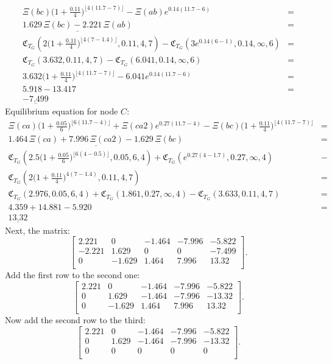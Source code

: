 \documentclass[10pt]{article}
\newcommand{\CC}{\mathfrak{C}}
\begin{document}
\begin{align*}
\Xi(bc) \Big( 1 + \frac{0.11}{4} \Big)^{ \lfloor 4(11.7 - 7) \rfloor } - \Xi(ab) e^{0.14( 11.7 - 6 ) } &= \\
\underline{ 1.629 \, \Xi(bc) - 2.221 \, \Xi(ab) } &= \\
\CC_{T_G} (2 \Big( 1 + \frac{0.11}{4} \Big)^{ \lfloor 4(7 - 1.4) \rfloor }, 0.11, 4, 7 ) - \CC_{T_G} ( 3e^{0.14 ( 6 - 1 ) }, 0.14, \infty, 6 ) &= \\
\CC_{T_G} ( 3.632, 0.11, 4, 7 ) - \CC_{T_G} ( 6.041, 0.14, \infty, 6 ) &= \\ 
3.632 \Big( 1 + \frac{0.11}{4} \Big)^{\lfloor 4(11.7 - 7) \rfloor} - 6.041e^{0.14(11.7 - 6)} &= \\
5.918 - 13.417 &= \\
\underline{-7.499}
\end{align*}
Equilibrium equation for node $C$:
\begin{align*}
\Xi(ca) \Big( 1 + \frac{0.05}{6} \Big)^{ \lfloor 6 ( 11.7 - 4) \rfloor } + \Xi(ca2) e^{ 0.27(11.7 - 4) } - \Xi(bc) \Big( 1 + \frac{0.11}{4} \Big)^{ \lfloor 4 (11.7 - 7) \rfloor } &= \\
\underline{1.464 \, \Xi(ca) +7.996 \, \Xi(ca2) - 1.629 \, \Xi(bc)} &= \\
\CC_{T_G} ( 2.5 \Big( 1 + \frac{0.05}{6} \Big)^{ \lfloor 6 ( 4 - 0.5 ) \rfloor }, 0.05, 6, 4) + \CC_{T_G} ( e^{ 0.27 (4 - 1.7) }, 0.27, \infty, 4 ) &- \\
\CC_{T_G} ( 2 \Big( 1 + \frac{0.11}{4} \Big)^{ 4 (7 - 1.4) }, 0.11, 4, 7 ) &= \\
\CC_{T_G} (2.976, 0.05, 6, 4) + \CC_{T_G} ( 1.861, 0.27, \infty, 4 ) - \CC_{T_G} ( 3.633, 0.11, 4, 7 ) &= \\
4.359 + 14.881 - 5.920 &= \\
\underline{13.32}
\end{align*}
Next, the matrix:
\[
\begin{bmatrix}
2.221 & 0 & -1.464 & -7.996 & -5.822 \\
-2.221 & 1.629 & 0 & 0 & -7.499 \\
0 & -1.629 & 1.464 & 7.996 & 13.32 \\
\end{bmatrix}.
\]
Add the first row to the second one:
\[
\begin{bmatrix}
2.221 & 0 & -1.464 & -7.996 & -5.822 \\
0 & 1.629 & -1.464 & -7.996 & -13.32 \\
0 & -1.629 & 1.464 & 7.996 & 13.32 \\
\end{bmatrix}.
\]
Now add the second row to the third:
\[
\begin{bmatrix}
2.221 & 0 & -1.464 & -7.996 & -5.822 \\
0 & 1.629 & -1.464 & -7.996 & -13.32 \\
0 & 0 & 0 & 0 & 0 \\
\end{bmatrix}.
\]
\end{document}
